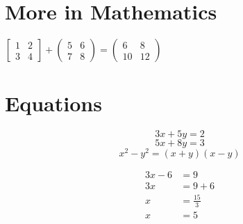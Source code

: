 \documentclass{article}
\begin{document}
	\pagecolor{yellow}
	\section{More in Mathematics}
	
	$ 
	\begin{bmatrix}
		1 & 2 \\
		3 & 4
	\end{bmatrix}
	+
	\begin{pmatrix}
		5 & 6 \\
		7 & 8
	\end{pmatrix}
	= 
	\begin{pmatrix}
		6 & 8 \\
		10 & 12
	\end{pmatrix}
	$
	\section{Equations}
	\begin{equation}
		3x + 5y = 2
	\end{equation}
	\begin{equation}
		5x + 8y = 3
	\end{equation}
	\begin{equation}
	x^{2} - y^{2} = (x+y) (x-y)
	\end{equation}

	\begin{align}
		3x - 6 &= 9 \\ %
		3x &= 9 + 6 \nonumber\\
		x &= \frac{15}{3} \nonumber\\
		x &= 5 \nonumber
	\end{align}
\end{document}
